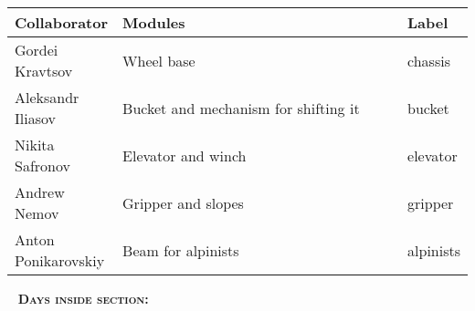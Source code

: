 	\begin{table}[H]
		\vspace{-2mm}
		\begin{center}
			\begin{tabular}{|p{0.2\linewidth}|p{0.7\linewidth}|p{0.1\linewidth}|}
				\hline
				Collaborator & Modules & Label \\
				\hline
				Gordei Kravtsov & Wheel base & chassis \\
				\hline
				Aleksandr Iliasov & Bucket and mechanism for shifting it & bucket \\
				\hline
				Nikita Safronov & Elevator and winch & elevator \\
				\hline
				Andrew Nemov & Gripper and slopes & gripper \\
				\hline
				Anton Ponikarovskiy & Beam for alpinists & alpinists \\
				\hline
			\end{tabular}
		\end{center}
	\end{table}
  
   \newline
  \textsc{\textbf{Days inside section:}}
  
  
  
  